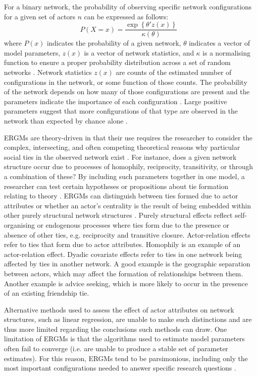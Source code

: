 For a binary network, the probability of observing specific network configurations for a given set of actors \(n\) can be expressed as follows: $$ P(X = x) = \frac{\exp \left \{ \theta'z(x)  \right \}}{\kappa (\theta )} $$ where $P(x)$ indicates the probability of a given network, $\theta$ indicates a vector of model parameters, $z(x)$ is a vector of network statistics, and $\kappa$ is a normalising function to ensure a proper probability distribution across a set of random networks \citep{shumate2010exponential}. Network statistics $z(x)$ are counts of the estimated number of configurations in the network, or some function of those counts. The probability of the network depends on how many of those configurations are present and the parameters indicate the importance of each configuration \citep{lusher2013exponential}. Large positive parameters suggest that more configurations of that type are observed in the network than expected by chance alone \citep{robins2009closure}. \medskip

ERGMs are theory-driven in that their use requires the researcher to consider the complex, intersecting, and often competing theoretical reasons why particular social ties in the observed network exist \citep{lusher2020advances}. For instance, does a given network structure occur due to processes of homophily, reciprocity, transitivity, or through a combination of these? By including such parameters together in one model, a researcher can test certain hypotheses or propositions about tie formation relating to theory \citep{robins2007recent}. ERGMs can distinguish between ties formed due to actor attributes or whether an actor’s centrality is the result of being embedded within other purely structural network structures \citep{lusher2020advances}. Purely structural effects reflect self-organising or endogenous processes where ties form due to the presence or absence of other ties, e.g. reciprocity and transitive closure. Actor-relation effects refer to ties that form due to actor attributes. Homophily is an example of an actor-relation effect. Dyadic covariate effects refer to ties in one network being affected by ties in another network. A good example is the geographic separation between actors, which may affect the formation of relationships between them. Another example is advice seeking, which is more likely to occur in the presence of an existing friendship tie. \medskip

Alternative methods used to assess the effect of actor attributes on network structures, such as linear regression, are unable to make such distinctions and are thus more limited regarding the conclusions such methods can draw. One limitation of ERGMs is that the algorithms used to estimate model parameters often fail to converge (i.e. are unable to produce a stable set of parameter estimates). For this reason, ERGMs tend to be parsimonious, including only the most important configurations needed to answer specific research questions \citep{mcallister2017balancing,silk2017application}. 

